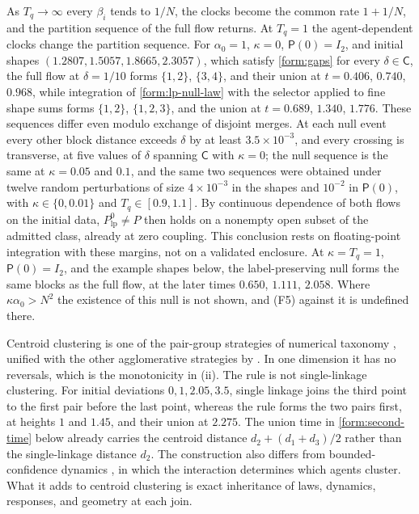 As $T_q\to\infty$ every $\beta_i$ tends to $1/N$, the clocks become the common rate $1+1/N$, and the partition sequence of the full flow returns. At $T_q=1$ the agent-dependent clocks change the partition sequence. For $\alpha_0=1$, $\kappa=0$, $\mathsf P(0)=I_2$, and initial shapes $(1.2807,1.5057,1.8665,2.3057)$, which satisfy \cref{form:gaps} for every $\delta\in\mathsf C$, the full flow at $\delta=1/10$ forms $\{1,2\}$, $\{3,4\}$, and their union at $t=0.406$, $0.740$, $0.968$, while integration of \cref{form:lp-null-law} with the selector applied to fine shape sums forms $\{1,2\}$, $\{1,2,3\}$, and the union at $t=0.689$, $1.340$, $1.776$. These sequences differ even modulo exchange of disjoint merges. At each null event every other block distance exceeds $\delta$ by at least $3.5\times10^{-3}$, and every crossing is transverse, at five values of $\delta$ spanning $\mathsf C$ with $\kappa=0$; the null sequence is the same at $\kappa=0.05$ and $0.1$, and the same two sequences were obtained under twelve random perturbations of size $4\times10^{-3}$ in the shapes and $10^{-2}$ in $\mathsf P(0)$, with $\kappa\in\{0,0.01\}$ and $T_q\in[0.9,1.1]$. By continuous dependence of both flows on the initial data, $P^0_{\mathrm{lp}}\neq P$ then holds on a nonempty open subset of the admitted class, already at zero coupling. This conclusion rests on floating-point integration with these margins, not on a validated enclosure. At $\kappa=T_q=1$, $\mathsf P(0)=I_2$, and the example shapes below, the label-preserving null forms the same blocks as the full flow, at the later times $0.650$, $1.111$, $2.058$. Where $\kappa\alpha_0>N^2$ the existence of this null is not shown, and (F5) against it is undefined there.

Centroid clustering is one of the pair-group strategies of numerical taxonomy \citep{SokalMichener1958}, unified with the other agglomerative strategies by \citet{LanceWilliams1967}. In one dimension it has no reversals, which is the monotonicity in (ii). The rule is not single-linkage clustering. For initial deviations $0,1,2.05,3.5$, single linkage joins the third point to the first pair before the last point, whereas the rule forms the two pairs first, at heights $1$ and $1.45$, and their union at $2.275$. The union time in \cref{form:second-time} below already carries the centroid distance $d_2+(d_1+d_3)/2$ rather than the single-linkage distance $d_2$. The construction also differs from bounded-confidence dynamics \citep{HegselmannKrause2002}, in which the interaction determines which agents cluster. What it adds to centroid clustering is exact inheritance of laws, dynamics, responses, and geometry at each join.

